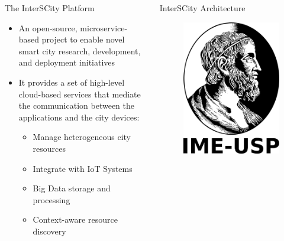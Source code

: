 \documentclass[xcolor={usenames,svgnames,dvipsnames},brazil,english]{beamer}
\newcommand\halfcol{\column{.46\textwidth}}
\begin{document}
\begin{frame}[fragile]
\begin{columns}[T]
  \begin{block}{The InterSCity Platform}
    \begin{itemize}
      \item An open-source, microservice-based project to enable novel
            smart city research, development, and deployment initiatives
      \item It provides a set of high-level cloud-based services that
            mediate the communication between the applications and the
            city devices:
      \begin{itemize}
        \item Manage heterogeneous city resources
        \item Integrate  with IoT Systems
        \item Big Data storage and processing
        \item Context-aware resource discovery
      \end{itemize}
    \end{itemize}
  \end{block}

  \halfcol

  \begin{block}{InterSCity Architecture}
    \begin{figure}[h]
      \includegraphics[width=.726\textwidth,trim=0 230 0 0,clip]{ime-logo}
    \end{figure}
  \end{block}


\end{columns}
\end{frame}
\end{document}
